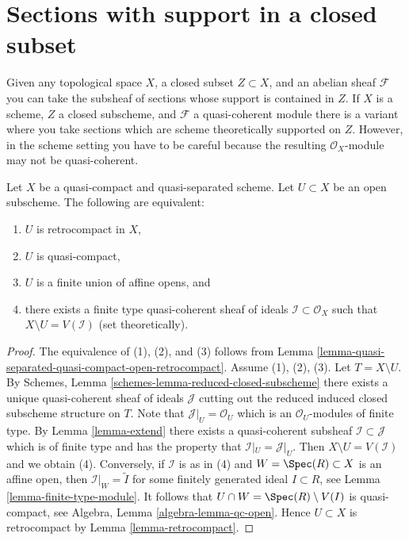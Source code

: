 \section{Sections with support in a closed subset}
\label{section-sections-with-support-in-closed}

\noindent
Given any topological space $X$, a closed subset $Z \subset X$, and an
abelian sheaf $\mathcal{F}$ you can take the subsheaf of sections whose
support is contained in $Z$. If $X$ is a scheme, $Z$ a closed
subscheme, and $\mathcal{F}$ a quasi-coherent module there is a variant
where you take sections which are scheme theoretically supported
on $Z$. However, in the scheme setting you have to be careful because
the resulting $\mathcal{O}_X$-module may not be quasi-coherent.

\begin{lemma}
\label{lemma-quasi-coherent-finite-type-ideals}
Let $X$ be a quasi-compact and quasi-separated scheme.
Let $U \subset X$ be an open subscheme. The following are equivalent:
\begin{enumerate}
\item $U$ is retrocompact in $X$,
\item $U$ is quasi-compact,
\item $U$ is a finite union of affine opens, and
\item there exists a finite type quasi-coherent sheaf of ideals
$\mathcal{I} \subset \mathcal{O}_X$ such that $X \setminus U = V(\mathcal{I})$
(set theoretically).
\end{enumerate}
\end{lemma}

\begin{proof}
The equivalence of (1), (2), and (3) follows from
Lemma \ref{lemma-quasi-separated-quasi-compact-open-retrocompact}.
Assume (1), (2), (3). Let $T = X \setminus U$. By
Schemes, Lemma \ref{schemes-lemma-reduced-closed-subscheme} there exists
a unique quasi-coherent sheaf of ideals $\mathcal{J}$ cutting
out the reduced induced closed subscheme structure on $T$.
Note that $\mathcal{J}|_U = \mathcal{O}_U$ which is an
$\mathcal{O}_U$-modules of finite type.
By Lemma \ref{lemma-extend} there exists a quasi-coherent subsheaf
$\mathcal{I} \subset \mathcal{J}$ which is of finite type
and has the property that $\mathcal{I}|_U = \mathcal{J}|_U$.
Then $X \setminus U = V(\mathcal{I})$ and we obtain (4). Conversely,
if $\mathcal{I}$ is as in (4) and $W = \Spec(R) \subset X$ is an affine
open, then $\mathcal{I}|_W = \widetilde{I}$ for some finitely generated
ideal $I \subset R$, see Lemma \ref{lemma-finite-type-module}.
It follows that $U \cap W = \Spec(R) \setminus V(I)$ is quasi-compact,
see Algebra, Lemma \ref{algebra-lemma-qc-open}. Hence $U \subset X$
is retrocompact by Lemma \ref{lemma-retrocompact}.
\end{proof}

